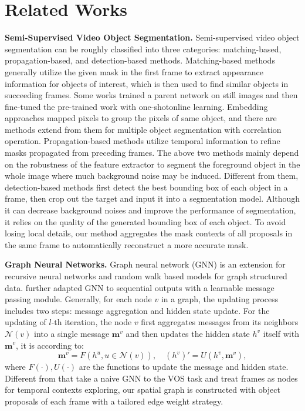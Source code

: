 \documentclass[letterpaper]{article} %
\begin{document}
\section{Related Works}
\noindent \textbf{Semi-Supervised Video Object Segmentation.}
Semi-supervised video object segmentation can be roughly classified into three categories: matching-based, propagation-based, and detection-based methods. Matching-based methods \cite{caelles2017one,voigtlaender2017online,zeng2019dmm} generally utilize the given mask in the first frame to extract appearance information for objects of interest, which is then used to find similar objects in succeeding frames. 
Some works \cite{caelles2017one,voigtlaender2017online} trained a parent network on still images and then fine-tuned the pre-trained work with one-shotonline learning. 
Embedding approaches \cite{chen2018blazingly,hu2018videomatch} mapped pixels to group the pixels of same object, and there are methods \cite{voigtlaender2019feelvos,wang2019ranet} extend from them for multiple object segmentation with correlation operation.
Propagation-based methods \cite{wug2018fast,johnander2019generative,xu2019mhp} utilize temporal information to refine masks propagated from preceding frames.
The above two methods mainly depend on the robustness of the feature extractor to segment the foreground object in the whole image where much background noise may be induced. Different from them, detection-based methods \cite{li2017video,wang2019fast,luiten2018premvos} first detect the best bounding box of each object in a frame, then crop out the target and input it into a segmentation model. Although it can decrease background noises and improve the performance of segmentation, it relies on the quality of the generated bounding box of each object. To avoid losing local details, our method aggregates the mask contexts of all proposals in the same frame to automatically reconstruct a more accurate mask.

\noindent \textbf{Graph Neural Networks.}
Graph neural network (GNN) \cite{scarselli2008graph} is an extension for recursive neural networks and random walk based models for graph structured data. \cite{gilmer2017neural,li2018deeper} further adapted GNN to sequential outputs with a learnable message passing module.
Generally, for each node $v$ in a graph, the updating process includes two steps: message aggregation and hidden state update. For the updating of $l$-th iteration, the node $v$ first aggregates messages from its neighbors $\mathcal{N}(v)$ into a single message $\bm{m}^v$ and then updates the hidden state $h^v$ itself with $\bm{m}^v$, it is according to:
\begin{equation}
    \bm{m}^v=F(h^u, u\in \mathcal{N}(v)), \quad (h^v){'}=U(h^v, \bm{m}^v),
\end{equation}
where $F(\cdot),U(\cdot)$ are the functions to update the message and hidden state. 
Different from \cite{haller2019spacetime,wang2019zero} that take a naive GNN to the VOS task and treat frames as nodes for temporal contexts exploring, our spatial graph is constructed with object proposals of each frame with a tailored edge weight strategy.
\end{document}
